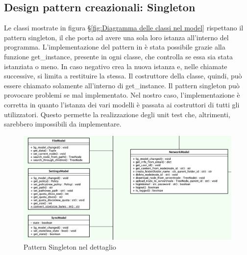 \subsection{Design pattern creazionali: Singleton}

Le classi mostrate in figura \S{}\ref{fig:Diagramma delle classi nel model} rispettano il pattern singleton, il che porta ad avere una sola loro istanza all'interno del programma.
\newline{}
L'implementazione del pattern in  è stata possibile grazie alla funzione get\_instance, presente in ogni classe,  che controlla se essa sia stata istanziata o meno. In caso negativo crea la nuova istanza e, nelle chiamate successive, si limita a restituire la stessa. Il costruttore della classe, quindi, può essere chiamato solamente all'interno di get\_instance. \newline{}
Il pattern singleton può provocare problemi se mal implementato. Nel nostro caso, l'implementazione è corretta in quanto l'istanza dei vari modelli è passata ai costruttori di tutti gli utilizzatori. Questo permette la realizzazione degli unit test che, altrimenti, sarebbero impossibili da implementare. 
\begin{figure}[H]
    \centering
    \includegraphics[scale = 0.43]{components/img/singleton-model.png}
    \caption{Pattern Singleton nel dettaglio}
    \label{fig:Diagramma del pattern singleton}
\end{figure}

